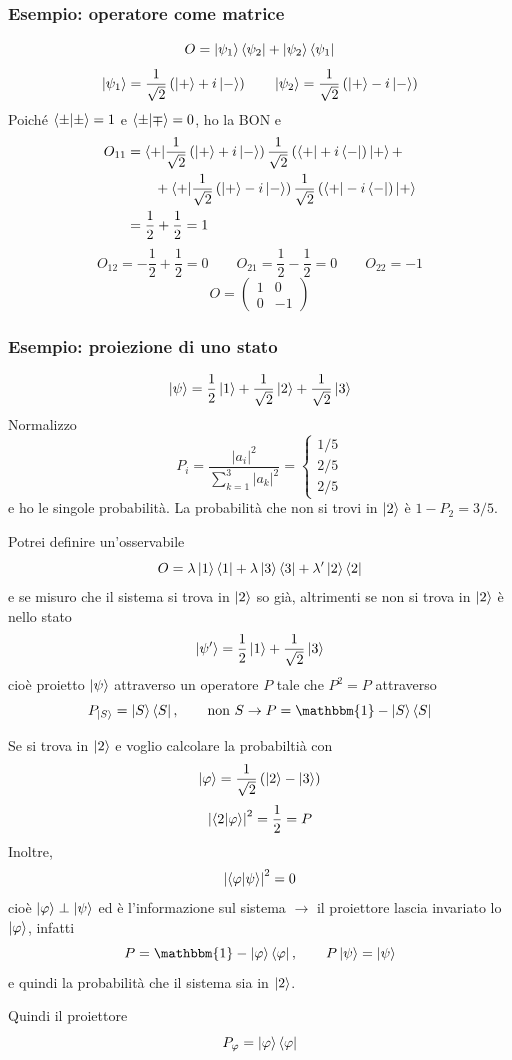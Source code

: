 \subsubsection{Esempio: operatore come matrice}
\[
  O = \ket{\psi_1}\bra{\psi_2} + \ket{\psi_2}\bra{\psi_1}
\]
\[
  \ket{\psi_1} = \frac{1}{\sqrt{2}} \left( \ket{+} + i \ket{-} \right)
  \qquad
  \ket{\psi_2} = \frac{1}{\sqrt{2}} \left( \ket{+} - i \ket{-} \right)
\]
Poiché \(\braket{\pm|\pm} = 1\) e \(\braket{\pm|\mp} = 0\), ho la BON e
\begin{align*}
  O_{11}
  &= \braket{+|\frac{1}{\sqrt{2}} \left(
    \ket{+} + i \ket{-}
  \right) \frac{1}{\sqrt{2}} \left(
    \bra{+} + i \bra{-}
  \right)|+} + \\
  &\qquad + \braket{+|\frac{1}{\sqrt{2}} \left(
    \ket{+} - i \ket{-}
  \right) \frac{1}{\sqrt{2}} \left(
    \bra{+} - i \bra{-}
  \right)|+} \\
  &= \frac{1}{2} + \frac{1}{2} = 1
\end{align*}
\[
  O_{12} = -\frac{1}{2} + \frac{1}{2} = 0 
  \qquad
  O_{21} = \frac{1}{2} - \frac{1}{2} = 0 \qquad O_{22} = -1
\]
\[
  O = \begin{pmatrix}
    1 & 0 \\
    0 & -1
  \end{pmatrix}
\]

\subsubsection{Esempio: proiezione di uno stato}
\[
  \ket{\psi} = \frac{1}{2} \ket{1}
    + \frac{1}{\sqrt{2}} \ket{2}
    + \frac{1}{\sqrt{2}} \ket{3}
\]
Normalizzo
\[
  P_i = \frac{|a_i|^2}{\sum_{k=1}^3 |a_k|^2} = \begin{cases}
    1/5 \\
    2/5 \\
    2/5
  \end{cases}
\]
e ho le singole probabilità. La probabilità che non si trovi in
\(\ket{2}\) è \(1 - P_2 = 3/5\).

\bigskip
\noindent
Potrei definire un'osservabile
\[
  O = \lambda \ket{1}\bra{1} + \lambda \ket{3}\bra{3} + \lambda' \ket{2}\bra{2}
\]
e se misuro che il sistema si trova in \(\ket{2}\) so già, altrimenti se non si
trova in \(\ket{2}\) è nello stato
\[
  \ket{\psi'} = \frac{1}{2} \ket{1} + \frac{1}{\sqrt{2}} \ket{3}
\]
cioè proietto \(\ket{\psi}\) attraverso un operatore \(P\) tale che \(P^2 = P\) attraverso
\[
  P_{\ket{S}} = \ket{S}\bra{S},
  \qquad
  \text{non } S \rightarrow P = \mathbbm{1} - \ket{S}\bra{S}
\]

\bigskip
\noindent
Se si trova in \(\ket{2}\) e voglio calcolare la probabiltià con
\[
  \ket{\varphi} = \frac{1}{\sqrt{2}} \left( \ket{2} - \ket{3} \right)
\]
\[
  \left| \braket{2|\varphi} \right|^2 = \frac{1}{2} = P
\]
Inoltre,
\[
  \left| \braket{\varphi|\psi} \right|^2 = 0
\]
cioè \(\ket{\varphi} \perp \ket{\psi}\) ed è l'informazione sul sistema
\(\rightarrow\) il proiettore lascia invariato lo \(\ket{\varphi}\), infatti
\[
  P = \mathbbm{1} - \ket{\varphi}\bra{\varphi},
  \qquad
  P \ket{\psi} = \ket{\psi}
\]
e quindi la probabilità che il sistema sia in \(\ket{2}\).

\bigskip
\noindent
Quindi il proiettore
\[
  P_\varphi = \ket{\varphi}\bra{\varphi}
\]
